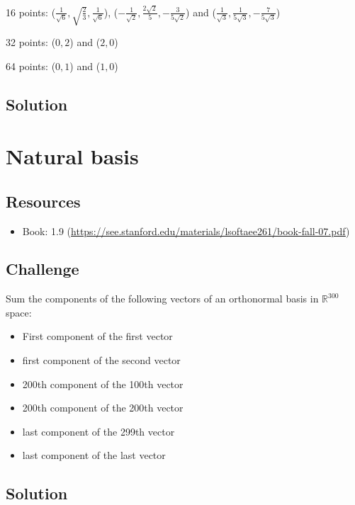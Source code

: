 16 points:
($\displaystyle \frac{1}{\sqrt{6}}, \sqrt{\frac{2}{3}}, \frac{1}{\sqrt{6}}$),
($\displaystyle -\frac{1}{\sqrt{2}},  \frac{2 \sqrt{2}}{5}, -\frac{3}{5 \sqrt{2}}$) and
($\displaystyle \frac{1}{\sqrt{3}},  \frac{1}{5 \sqrt{3}}, -\frac{7}{5 \sqrt{3}}$)

32 points:
($0, 2$) and ($2, 0$)

64 points:
($0, 1$) and ($1, 0$)

\subsection*{Solution}
\six{}





\newpage
\section{Natural basis}

\subsection*{Resources}
\begin{itemize}
    \item Book: 1.9 (\url{https://see.stanford.edu/materials/lsoftaee261/book-fall-07.pdf})
\end{itemize}

\subsection*{Challenge}
Sum the components of the following vectors of an orthonormal basis in $\mathbb{R}^{300}$ space:

\begin{itemize}
    \item First component of the first vector
    \item first component of the second vector
    \item 200th component of the 100th vector
    \item 200th component of the 200th vector
    \item last component of the 299th vector
    \item last component of the last vector
\end{itemize}

\subsection*{Solution}
\six{}

